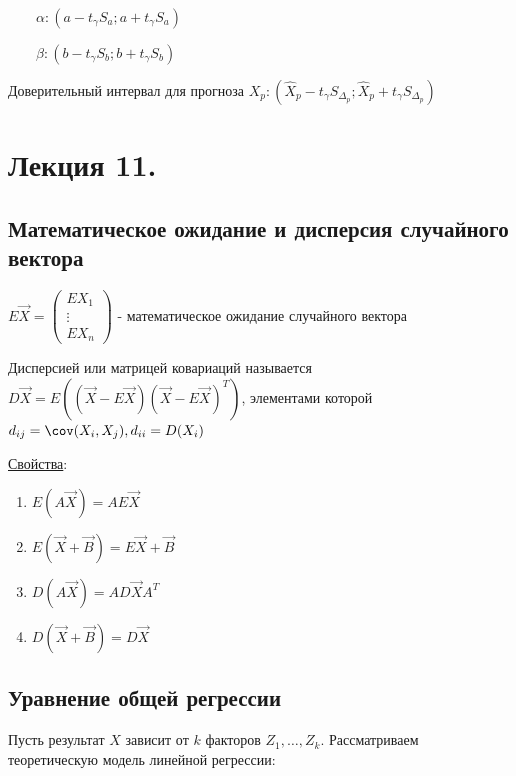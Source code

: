 \documentclass[12pt]{article}
\begin{document}
$\qquad \alpha: (a - t_\gamma S_a; a + t_\gamma S_a)$

$\qquad \beta: (b - t_\gamma S_b; b + t_\gamma S_b)$

Доверительный интервал для прогноза $X_p: (\hat X_p - t_\gamma S_{\Delta_p}; \hat X_p + t_\gamma S_{\Delta_p})$








\section{Лекция 11.}

\subsection{Математическое ожидание и дисперсия случайного вектора}

\Def $E \vec X = \begin{pmatrix}E X_1 \\ \vdots \\ E X_n \end{pmatrix}$ - математическое ожидание случайного вектора

\Def Дисперсией или матрицей ковариаций называется $D \vec X = E ((\vec X - E \vec X) (\vec X - E \vec X)^T )$, 
элементами которой $d_{ij} = \cov (X_i, X_j), d_{ii} = D(X_i)$

\underline{Свойства}:

\begin{enumerate}
    \item $E(A \vec X) = A E \vec X$
    \item $E(\vec X + \vec B) = E \vec X + \vec B$
    \item $D(A \vec X) = A D \vec X A^T$
    \item $D(\vec X + \vec B) = D \vec X$
\end{enumerate}

\subsection{Уравнение общей регрессии}

\hypertarget{general_regression}{}

Пусть результат $X$ зависит от $k$ факторов $Z_1, \dots, Z_k$. Рассматриваем теоретическую модель линейной регрессии:
\end{document}

